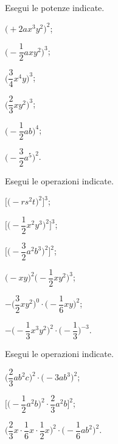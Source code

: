 \begin{esercizio}
 \label{ese:9.18}
 Esegui le potenze indicate.
\begin{multicols}{3}
\begin{enumeratea}
\spazielenx
 \item $\big(+2ax^{3}y^{2}\big)^{2}$;
 \item $\bigg(-{\dfrac{1}{2}}axy^{2}\bigg)^{3}$;
 \item $\bigg(\dfrac{3}{4}x^{4}y\bigg)^{3}$;
 \item $\bigg(\dfrac{2}{3}xy^{2}\bigg)^{3}$;
 \item $\bigg(-{\dfrac{1}{2}}ab\bigg)^{4}$;
 \item $\bigg(-{\dfrac{3}{2}}a^{5}\bigg)^{2}$.
\end{enumeratea}
\end{multicols}
\end{esercizio}

\begin{esercizio}
 \label{ese:9.19}
 Esegui le operazioni indicate.
\begin{multicols}{2}
\begin{enumeratea}
\spazielenx
 \item $\bigg[\big(-rs^{2}t\big)^{2}\bigg]^{3}$;
 \item $\Bigg[\bigg(-{\dfrac{1}{2}}x^{2}y^{3}\bigg)^{2}\Bigg]^{3}$;
 \item $\Bigg[\bigg(-{\dfrac{3}{2}}a^{2}b^{3}\bigg)^{2}\Bigg]^{2}$;
 \item $\big(-xy\big)^{2}\bigg(-{\dfrac{1}{2}}xy^{2}\bigg)^{3}$;
 \item $-\bigg(\dfrac{3}{2}xy^{2}\bigg)^{0}\cdot\bigg(-{\dfrac{1}{6}}xy\bigg)^{2}$;
 \item $-\bigg(-{\dfrac{1}{3}}x^{3}y^{2}\bigg)^{2}\cdot\bigg(-{\dfrac{1}{3}}\bigg)^{-3}$.
\end{enumeratea}
\end{multicols}
\end{esercizio}

\begin{esercizio}
 \label{ese:9.20}
 Esegui le operazioni indicate.
\begin{multicols}{2}
\begin{enumeratea}
\spazielenx
 \item $\bigg(\dfrac{2}{3}ab^{2}c\bigg)^{2}\cdot\big(-3ab^{3}\big)^{2}$;
 \item $\Bigg[\bigg(-{\dfrac{1}{2}}a^{2}b\bigg)^{2}\cdot{\dfrac{2}{3}a^{2}b}\Bigg]^{2}$;
 \item $\bigg(\dfrac{2}{3}x\cdot{\dfrac{1}{6}}x\cdot {\dfrac{1}{2}}x\bigg)^{2}\cdot\bigg(-{\dfrac{1}{6}}ab^{2}\bigg)^{2}$.
\end{enumeratea}
\end{multicols}
\end{esercizio}


